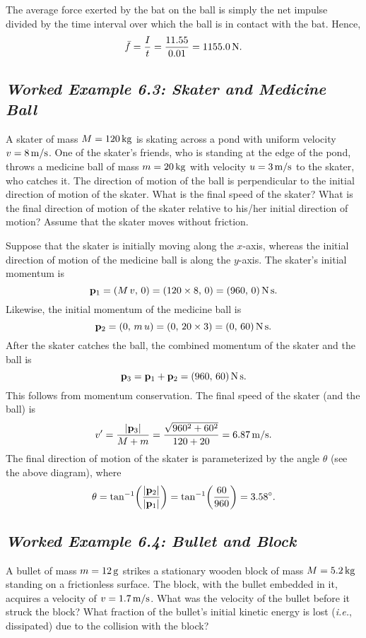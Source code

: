 The average force exerted by the bat on the ball is simply the net impulse divided by the
time interval over which the ball is in contact with the bat. Hence,
$$
\bar{f} = \frac{I}{t}= \frac{11.55}{0.01} = 1155.0\,{\rm N}.
$$

\subsection*{\em Worked Example 6.3: Skater and Medicine Ball}
 A skater of  mass $M=120\,{\rm kg}$ is skating across a pond
with uniform velocity $v=8\,{\rm m/s}$. One of the skater's friends, who is
standing at the edge of the pond, throws a
medicine ball of mass $m=20\,{\rm kg}$ with velocity $u=3\,{\rm m/s}$ to the skater, who catches
it. The direction of motion of the ball is perpendicular to the initial direction of motion
of the skater. 
What is the final speed of the skater? What is the final direction
of motion of the skater relative to his/her initial direction of motion? Assume that the
skater moves without friction. 

\begin{figure*}[h]
\epsfysize=1.5in
\centerline{}
\end{figure*}

 Suppose that the skater is initially moving along the $x$-axis, whereas
the initial direction of motion of the medicine ball is along the $y$-axis. The skater's
initial momentum is
$$
{\bf p}_1 = (M\,v,\,0) = (120\times 8,\,0 ) = (960,\, 0)\,{\rm N\,s}.
$$
Likewise, the initial momentum of the medicine ball is
$$
{\bf p}_2 = (0,\,m\,u) = (0,\,20\times 3) = (0, \,60) \,{\rm N\,s}.
$$
After the skater catches the ball, the combined momentum of the skater
and the ball is
$$
{\bf p}_3 = {\bf p}_1 + {\bf p}_2 = (960, \,60) \,{\rm N\,s}.
$$
This follows from momentum conservation. The final speed of the skater (and the ball)
is
$$
v' = \frac{|{\bf p}_3|}{M+m} = \frac{\sqrt{960^2+60^2}}{120+20} = 6.87\,{\rm m/s}.
$$
The final direction of motion of the skater is parameterized by the angle $\theta$
(see the above diagram), where
$$
\theta = \tan^{-1}\!\left(\frac{|{\bf p}_2|}{|{\bf p}_1|}
\right) =\tan^{-1}\!\left(\frac{60}{960}\right)= 3.58^\circ.
$$

\subsection*{\em Worked Example 6.4: Bullet and Block}
 A bullet of mass $m=12\,{\rm g}$ strikes a stationary wooden block
of mass $M=5.2\,{\rm kg}$ standing on a frictionless surface. The block, with
the bullet embedded in it, acquires a velocity of $v=1.7\,{\rm m/s}$. What
was the velocity of the bullet before it struck the block? What fraction of the
bullet's initial kinetic energy is lost ({\em i.e.}, dissipated) due to
the collision with the block?



